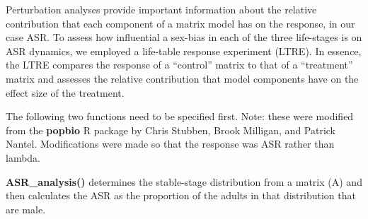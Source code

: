\documentclass[]{article}
\begin{document}
Perturbation analyses provide important information about the relative
contribution that each component of a matrix model has on the response,
in our case ASR. To assess how influential a sex-bias in each of the
three life-stages is on ASR dynamics, we employed a life-table response
experiment (LTRE). In essence, the LTRE compares the response of a
``control'' matrix to that of a ``treatment'' matrix and assesses the
relative contribution that model components have on the effect size of
the treatment.

The following two functions need to be specified first. Note: these were
modified from the \textbf{popbio} R package by Chris Stubben, Brook
Milligan, and Patrick Nantel. Modifications were made so that the
response was ASR rather than lambda.

\textbf{ASR\_analysis()} determines the stable-stage distribution from a
matrix (A) and then calculates the ASR as the proportion of the adults
in that distribution that are male.
\end{document}
